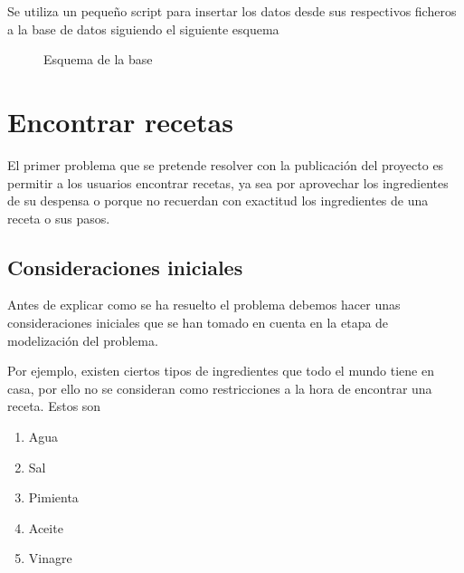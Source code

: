 Se utiliza un pequeño \gls{script} para insertar los datos desde sus respectivos ficheros a la base de datos siguiendo el siguiente esquema
\begin{figure}[h!]
    \centering
    \caption{Esquema de la \gls{base}}
    \label{fig:scheme}
\end{figure}

\section{Encontrar recetas}
El primer problema que se pretende resolver con la publicación del proyecto es permitir a los usuarios encontrar recetas, ya sea por aprovechar los ingredientes de su despensa o porque no recuerdan con exactitud los ingredientes de una receta o sus pasos.

\subsection{Consideraciones iniciales}
Antes de explicar como se ha resuelto el problema debemos hacer unas consideraciones iniciales que se han tomado en cuenta en la etapa de modelización del problema.

Por ejemplo, existen ciertos tipos de ingredientes que todo el mundo tiene en casa, por ello no se consideran como restricciones a la hora de encontrar una receta. Estos son
\begin{enumerate}
    \item Agua
    \item Sal
    \item Pimienta
    \item Aceite
    \item Vinagre
\end{enumerate}

